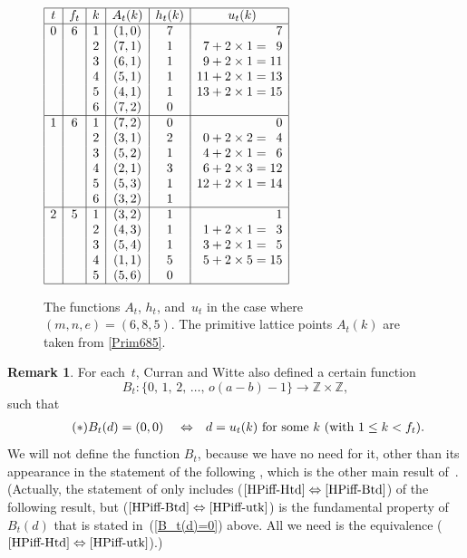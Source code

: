 \documentclass[11pt]{amsart}
\theoremstyle{definition}
\newtheorem{remark}[equation]{Remark}
\newcounter{case}
\numberwithin{case}{startcases}
\numberwithin{equation}{section}
\newcommand{\Z}{\mathbb{Z}}  %
\begin{document}
	
	\begin{figure}
		$\begin{array}{|c|c|c|c|c|r|}
			\hline
			t & f_t & k & A_t(k) & h_t(k) & u_t(k) \hphantom{= 09} \\
			\hline
			0 & 6 & 1 & (1,0) & 7 & 7 \\
			& & 2 & (7,1) & 1 & 7 + 2 \times 1 = \phantom0 9 \\
			& & 3 & (6,1) & 1 & 9 + 2 \times 1 = 11 \\
			& & 4 & (5,1) & 1 & 11 + 2 \times 1 = 13 \\
			& & 5 & (4,1) & 1 & 13 + 2 \times 1 = 15 \\
			& & 6 & (7,2) & 0 &  \\
			\hline
			1 & 6 & 1 & (7,2) & 0 & 0 \\
			& & 2 & (3,1) & 2 & 0 + 2 \times 2 = \phantom0 4 \\
			& & 3 & (5,2) & 1 & 4 + 2 \times 1 = \phantom0 6 \\
			& & 4 & (2,1) & 3 & 6 + 2 \times 3 = 12 \\
			& & 5 & (5,3) & 1 & 12 + 2 \times 1 = 14 \\
			& & 6 & (3,2) & 1 &  \\
			\hline
			2 & 5 & 1 & (3,2) & 1 & 1 \\
			& & 2 & (4,3) & 1 & 1 + 2 \times 1 = \phantom0 3 \\
			& & 3 & (5,4) & 1 & 3 + 2 \times 1 = \phantom0 5 \\
			& & 4 & (1,1) & 5 & 5 + 2 \times 5 = 15 \\
			& & 5 & (5,6) & 0 &  \\
			\hline
		\end{array}$
		\caption{The functions $A_t$, $h_t$, and~$u_t$ in the case where $(m,n,e) = (6,8,5)$. The primitive lattice points $A_t(k)$ are taken from \cref{Prim685}.}
		\label{uDefnEg}
	\end{figure}
	
	
	\begin{remark}
		For each~$t$, Curran and Witte \cite[Notation 3.14]{Curran} also defined a certain function
		\[ B_t \colon \{ 0, \, 1, \, 2, \, \ldots, \, o(a - b) - 1 \} \to \Z \times \Z , \]
		such that
		\begin{align} \label{B_t(d)=0} \tag{$*$}
			\text{$B_t(d) = (0,0)$ \quad$\Leftrightarrow$\quad $d = u_t(k)$ for some~$k$ (with $1 \le k < f_t$).}
		\end{align}
		We will not define the function $B_t$, because we have no need for it, other than its appearance in the statement of the following , which is the other main result of~\cite{Curran}. (Actually, the statement of \cite[Thm.~7.1]{Curran} only includes ($\ref{HPiff-Htd} \Leftrightarrow \ref{HPiff-Btd}$) of the following result, but ($\ref{HPiff-Btd} \Leftrightarrow \ref{HPiff-utk}$) is the fundamental property of $B_t(d)$ that is stated in~(\ref{B_t(d)=0}) above. All we need is the equivalence ($\ref{HPiff-Htd} \Leftrightarrow \ref{HPiff-utk}$).)
	\end{remark}
	
\end{document}
